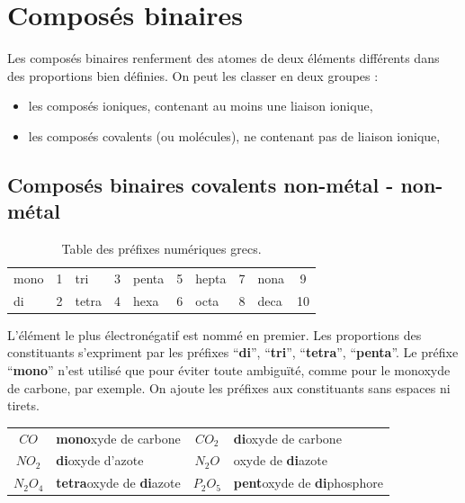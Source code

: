 \documentclass[
  11pt,
  french,
  a4paper,
  openany]{book}
\providecommand{\tightlist}{%
  \setlength{\itemsep}{0pt}\setlength{\parskip}{0pt}}
\begin{document}
\hypertarget{composuxe9s-binaires}{%
\section{Composés binaires}\label{composuxe9s-binaires}}

Les composés binaires renferment des atomes de deux éléments différents dans des proportions bien définies. On peut les classer en deux groupes :

\begin{itemize}
\tightlist
\item
  les composés ioniques, contenant au moins une liaison ionique,
\item
  les composés covalents (ou molécules), ne contenant pas de liaison ionique,
\end{itemize}

\hypertarget{composuxe9s-binaires-covalents-non-muxe9tal---non-muxe9tal}{%
\subsection{Composés binaires covalents \textbar{} non-métal - non-métal}\label{composuxe9s-binaires-covalents-non-muxe9tal---non-muxe9tal}}

\begin{longtable}[]{@{}lclclclclc@{}}
\caption{\label{tab:prefixes-numeriques-grecs} Table des préfixes numériques grecs.}\tabularnewline
\toprule
\endhead
mono & 1 & tri & 3 & penta & 5 & hepta & 7 & nona & 9\tabularnewline
di & 2 & tetra & 4 & hexa & 6 & octa & 8 & deca & 10\tabularnewline
\bottomrule
\end{longtable}

L'élément le plus électronégatif est nommé en premier. Les proportions des constituants s'expriment par les préfixes ``\textbf{di}'', ``\textbf{tri}'', ``\textbf{tetra}'', ``\textbf{penta}''. Le préfixe ``\textbf{mono}'' n'est utilisé que pour éviter toute ambiguïté, comme pour le monoxyde de carbone, par exemple. On ajoute les préfixes aux constituants sans espaces ni tirets.

\begin{longtable}[]{@{}clcl@{}}
\toprule
\endhead
\(CO\) & \textbf{mono}xyde de carbone & \(CO_2\) & \textbf{di}oxyde de carbone\tabularnewline
\(NO_2\) & \textbf{di}oxyde d'azote & \(N_2O\) & oxyde de \textbf{di}azote\tabularnewline
\(N_2O_4\) & \textbf{tetra}oxyde de \textbf{di}azote & \(P_2O_5\) & \textbf{pent}oxyde de \textbf{di}phosphore\tabularnewline
\bottomrule
\end{longtable}
\end{document}
